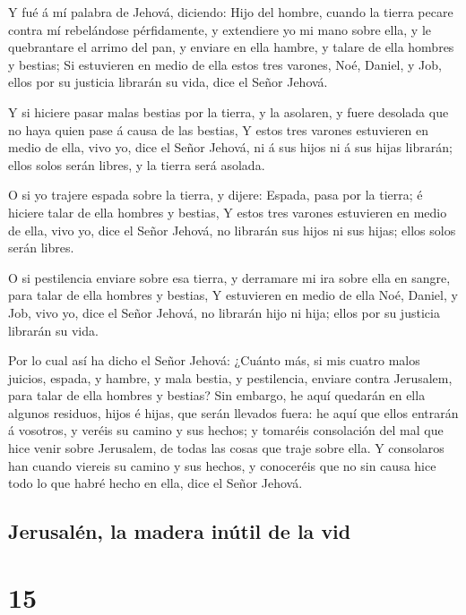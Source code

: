  Y fué á mí palabra de Jehová, diciendo: 
Hijo del hombre, cuando la tierra pecare contra mí rebelándose
pérfidamente, y extendiere yo mi mano sobre ella, y le quebrantare el
arrimo del pan, y enviare en ella hambre, y talare de ella hombres y
bestias;  Si estuvieren en medio de ella estos tres
varones, Noé, Daniel, y Job, ellos por su justicia librarán su vida,
dice el Señor Jehová.

 Y si hiciere pasar malas bestias por la tierra, y la
asolaren, y fuere desolada que no haya quien pase á causa de las
bestias,  Y estos tres varones estuvieren en medio de
ella, vivo yo, dice el Señor Jehová, ni á sus hijos ni á sus hijas
librarán; ellos solos serán libres, y la tierra será asolada.

 O si yo trajere espada sobre la tierra, y dijere:
Espada, pasa por la tierra; é hiciere talar de ella hombres y bestias,
 Y estos tres varones estuvieren en medio de ella, vivo
yo, dice el Señor Jehová, no librarán sus hijos ni sus hijas; ellos
solos serán libres.

 O si pestilencia enviare sobre esa tierra, y derramare
mi ira sobre ella en sangre, para talar de ella hombres y bestias,
 Y estuvieren en medio de ella Noé, Daniel, y Job, vivo
yo, dice el Señor Jehová, no librarán hijo ni hija; ellos por su
justicia librarán su vida.

 Por lo cual así ha dicho el Señor Jehová: ¿Cuánto más,
si mis cuatro malos juicios, espada, y hambre, y mala bestia, y
pestilencia, enviare contra Jerusalem, para talar de ella hombres y
bestias?  Sin embargo, he aquí quedarán en ella algunos
residuos, hijos é hijas, que serán llevados fuera: he aquí que ellos
entrarán á vosotros, y veréis su camino y sus hechos; y tomaréis
consolación del mal que hice venir sobre Jerusalem, de todas las cosas
que traje sobre ella.  Y consolaros han cuando viereis su
camino y sus hechos, y conoceréis que no sin causa hice todo lo que
habré hecho en ella, dice el Señor Jehová.

\hypertarget{jerusaluxe9n-la-madera-inuxfatil-de-la-vid}{%
\subsection{Jerusalén, la madera inútil de la
vid}\label{jerusaluxe9n-la-madera-inuxfatil-de-la-vid}}

\hypertarget{section-14}{%
\section{15}\label{section-14}}

